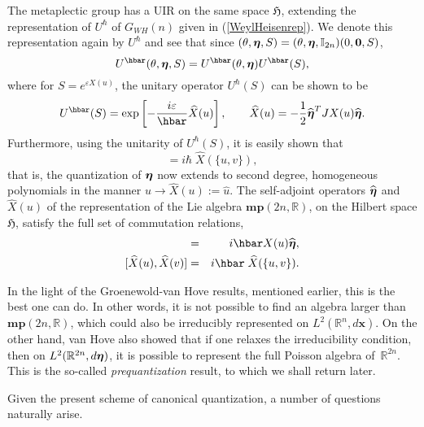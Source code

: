 \documentclass[12pt]{amsart}
\numberwithin{equation}{section}
\theoremstyle{remark}
\newcommand\HH{\mathfrak H}
\newcommand{\be}{\begin{equation}}
\newcommand{\en}{\end{equation}}
\newcommand{\bea}{\begin{eqnarray}}
\newcommand{\ena}{\end{eqnarray}}
\newcommand{\bfeta}{\mbox{\boldmath $\eta$}}
\newcommand{\bx}{\mathbf x}
\newcommand{\bmp}{\mathbf{mp}}
\begin{document}
The metaplectic group has a UIR on the same space $\HH$, extending
the representation of $U^{\hbar}$ of $G_{WH}(n)$ given in
(\ref{WeylHeisenrep}). We denote this representation again by
$U^{\hbar}$ and see that since $(\theta , \bfeta , S) =
(\theta , \bfeta , {\mathbb I}_{2n})(0 , \mathbf 0 , S)$,
\be
   U^{\hbar} (\theta , \bfeta , S) =
      U^{\hbar}(\theta , \bfeta)U^{\hbar}(S),
\label{metaplectrep1}
\en
where for $S = \displaystyle{e^{\varepsilon X(u)}}$, the unitary operator
$U^{\hbar}(S)$ can be shown \cite{bib:-simsudmu1} to be
\be
  U^{\hbar}(S) = \exp\left[-\frac {i\varepsilon}\hbar \widehat{X}(u)
     \right], \qquad \widehat{X}(u) = -\frac 12 \widehat{\bfeta}^{T}
        JX(u)\widehat{\bfeta}.
\label{metaplectrep2}
\en
Furthermore, using the unitarity of $U^{\hbar}(S)$, it is easily shown that
\be
  [\widehat{X}(u), \widehat{X}(v)] = i\hbar\; \widehat{X}(\{u,v\}),
\label{metaplectrep3}
\en
that is, the quantization of $\bfeta$ now extends to second degree,
homogeneous polynomials in the manner $u \rightarrow  \widehat{X}(u) :=
\widehat{u}$. The  self-adjoint operators $\widehat{\bfeta}$ and
$\widehat{X}(u)$ of the representation of the Lie algebra
$\bmp(2n, \mathbb R )$, on the Hilbert space $\HH$, satisfy the full
set of commutation relations,
\bea
 [\widehat{\bfeta}, \widehat{X}(u)] & = & i\hbar X(u)\widehat{\bfeta},
           \nonumber\\[0pt]
  [\widehat{X}(u), \widehat{X}(v)]  &  = & i\hbar\;\widehat{X}(\{u,v\}).
\label{metaplectrep4}
\ena

    In the light of the Groenewold-van Hove results, mentioned earlier,
this is the best one can do. In other words, it is
not possible to find an algebra larger than
$\bmp(2n, \mathbb R )$, which could also be irreducibly
represented on $L^{2}({\mathbb R}^{n}, d\bx )$. On the other hand,
van Hove also showed that if one relaxes the irreducibility condition, then
on $L^{2}({\mathbb R}^{2n}, d\bfeta )$,
it is possible to represent the full Poisson algebra
of~${\mathbb R}^{2n}$. This is the so-called
{\em prequantization} result, to which we shall return later.

Given the present scheme of canonical quantization, a number of questions
naturally arise.
\end{document}
